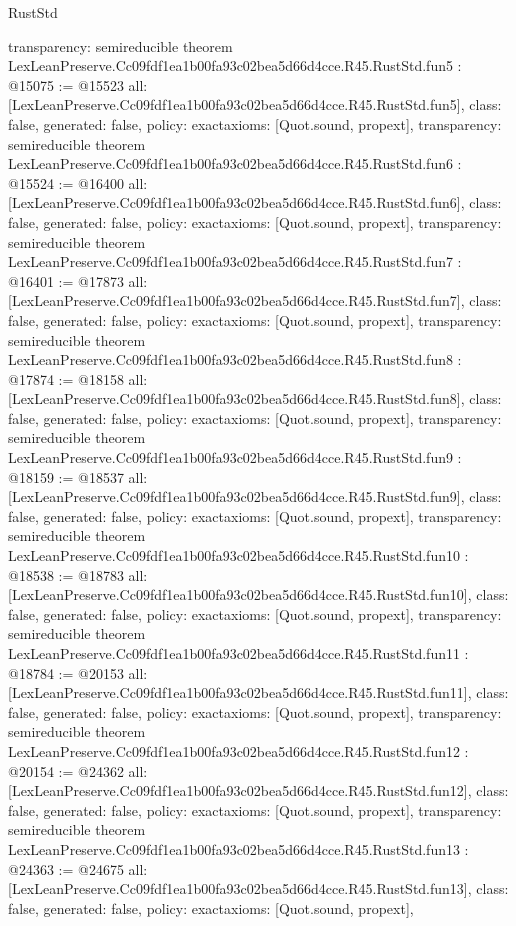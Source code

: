 \begin{lexlean}{RustStd}
\begin{coremodule}
{  transparency: semireducible
}
theorem LexLeanPreserve.Cc09fdf1ea1b00fa93c02bea5d66d4cce.R45.RustStd.fun5 : @15075 := @15523 {
  all: [LexLeanPreserve.Cc09fdf1ea1b00fa93c02bea5d66d4cce.R45.RustStd.fun5],
  class: false,
  generated: false,
  policy: exact{axioms: [Quot.sound, propext]},
  transparency: semireducible
}
theorem LexLeanPreserve.Cc09fdf1ea1b00fa93c02bea5d66d4cce.R45.RustStd.fun6 : @15524 := @16400 {
  all: [LexLeanPreserve.Cc09fdf1ea1b00fa93c02bea5d66d4cce.R45.RustStd.fun6],
  class: false,
  generated: false,
  policy: exact{axioms: [Quot.sound, propext]},
  transparency: semireducible
}
theorem LexLeanPreserve.Cc09fdf1ea1b00fa93c02bea5d66d4cce.R45.RustStd.fun7 : @16401 := @17873 {
  all: [LexLeanPreserve.Cc09fdf1ea1b00fa93c02bea5d66d4cce.R45.RustStd.fun7],
  class: false,
  generated: false,
  policy: exact{axioms: [Quot.sound, propext]},
  transparency: semireducible
}
theorem LexLeanPreserve.Cc09fdf1ea1b00fa93c02bea5d66d4cce.R45.RustStd.fun8 : @17874 := @18158 {
  all: [LexLeanPreserve.Cc09fdf1ea1b00fa93c02bea5d66d4cce.R45.RustStd.fun8],
  class: false,
  generated: false,
  policy: exact{axioms: [Quot.sound, propext]},
  transparency: semireducible
}
theorem LexLeanPreserve.Cc09fdf1ea1b00fa93c02bea5d66d4cce.R45.RustStd.fun9 : @18159 := @18537 {
  all: [LexLeanPreserve.Cc09fdf1ea1b00fa93c02bea5d66d4cce.R45.RustStd.fun9],
  class: false,
  generated: false,
  policy: exact{axioms: [Quot.sound, propext]},
  transparency: semireducible
}
theorem LexLeanPreserve.Cc09fdf1ea1b00fa93c02bea5d66d4cce.R45.RustStd.fun10 : @18538 := @18783 {
  all: [LexLeanPreserve.Cc09fdf1ea1b00fa93c02bea5d66d4cce.R45.RustStd.fun10],
  class: false,
  generated: false,
  policy: exact{axioms: [Quot.sound, propext]},
  transparency: semireducible
}
theorem LexLeanPreserve.Cc09fdf1ea1b00fa93c02bea5d66d4cce.R45.RustStd.fun11 : @18784 := @20153 {
  all: [LexLeanPreserve.Cc09fdf1ea1b00fa93c02bea5d66d4cce.R45.RustStd.fun11],
  class: false,
  generated: false,
  policy: exact{axioms: [Quot.sound, propext]},
  transparency: semireducible
}
theorem LexLeanPreserve.Cc09fdf1ea1b00fa93c02bea5d66d4cce.R45.RustStd.fun12 : @20154 := @24362 {
  all: [LexLeanPreserve.Cc09fdf1ea1b00fa93c02bea5d66d4cce.R45.RustStd.fun12],
  class: false,
  generated: false,
  policy: exact{axioms: [Quot.sound, propext]},
  transparency: semireducible
}
theorem LexLeanPreserve.Cc09fdf1ea1b00fa93c02bea5d66d4cce.R45.RustStd.fun13 : @24363 := @24675 {
  all: [LexLeanPreserve.Cc09fdf1ea1b00fa93c02bea5d66d4cce.R45.RustStd.fun13],
  class: false,
  generated: false,
  policy: exact{axioms: [Quot.sound, propext]},
}
\end{coremodule}
\end{lexlean}
